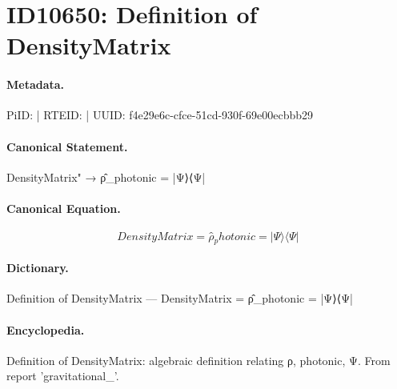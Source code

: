 \section*{ID10650: Definition of DensityMatrix}
\paragraph{Metadata.}
PiID:  | RTEID:  | UUID: f4e29e6c-cfce-51cd-930f-69e00ecbbb29

\paragraph{Canonical Statement.}
DensityMatrix" → ρ̂\_photonic = |Ψ⟩⟨Ψ|

\paragraph{Canonical Equation.}
\[
DensityMatrix = ρ̂_photonic = |Ψ⟩⟨Ψ|
\]

\paragraph{Dictionary.}
Definition of DensityMatrix — DensityMatrix = ρ̂\_photonic = |Ψ⟩⟨Ψ|

\paragraph{Encyclopedia.}
Definition of DensityMatrix: algebraic definition relating ρ, photonic, Ψ. From report 'gravitational\_'.

